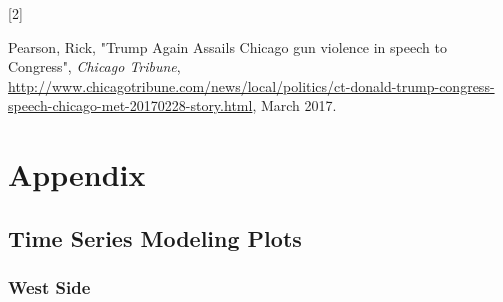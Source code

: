 \documentclass{article} %
\begin{document}
\hypertarget{Ref2}{[2]} Pearson, Rick, "Trump Again Assails Chicago gun violence in speech to Congress", \textit{Chicago Tribune}, \url{http://www.chicagotribune.com/news/local/politics/ct-donald-trump-congress-speech-chicago-met-20170228-story.html}, March 2017.


\clearpage
\newpage

\section{Appendix}
\label{appendix}


\subsection{Time Series Modeling Plots}
\label{appendix_regression}

 
\subsubsection{West Side}
 
\end{document}
